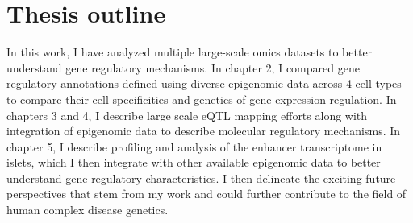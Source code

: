 \section{Thesis outline}
In this work, I have analyzed multiple large-scale omics datasets to better understand gene regulatory mechanisms. In chapter 2, I compared gene regulatory annotations defined using diverse epigenomic data across 4 cell types to compare their cell specificities and genetics of gene expression regulation. In chapters 3 and 4, I describe large scale eQTL mapping efforts along with integration of epigenomic data to describe molecular regulatory mechanisms. In chapter 5, I describe profiling and analysis of the enhancer transcriptome in islets, which I then integrate with other available epigenomic data to better understand gene regulatory characteristics. I then delineate the exciting future perspectives that stem from my work and could further contribute to the field of human complex disease genetics.